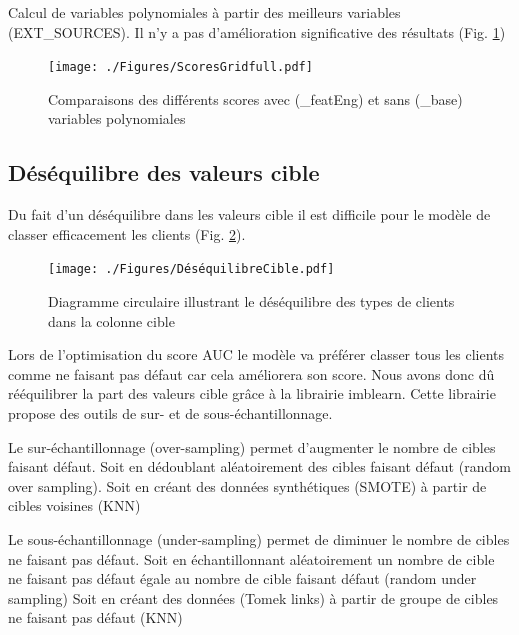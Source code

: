 \documentclass[12pt, a4paper]{article}
\begin{document}
Calcul de variables polynomiales à partir des meilleurs variables (EXT\_SOURCES).
Il n'y a pas d'amélioration significative des résultats (Fig. \ref{fig:ScoresGridFull})

\begin{figure}[h]
    \begin{center}
        \texttt{[image: ./Figures/ScoresGridfull.pdf]}
    \end{center}
    \caption{Comparaisons des différents scores avec (\_featEng) et sans (\_base) variables polynomiales}
    \label{fig:ScoresGridFull}
\end{figure}

\subsection{Déséquilibre des valeurs cible}

Du fait d'un déséquilibre dans les valeurs cible il est difficile pour le modèle de classer efficacement les clients (Fig. \ref{fig:DéséquilibreCible}).

\begin{figure}[h]
    \begin{center}
        \texttt{[image: ./Figures/DéséquilibreCible.pdf]}
    \end{center}
    \caption{Diagramme circulaire illustrant le déséquilibre des types de clients dans la colonne cible}
    \label{fig:DéséquilibreCible}
\end{figure}

Lors de l'optimisation du score AUC le modèle va préférer classer tous les clients comme ne faisant pas défaut car cela améliorera son score.
Nous avons donc dû rééquilibrer la part des valeurs cible grâce à la librairie imblearn.
Cette librairie propose des outils de sur- et de sous-échantillonnage.

Le sur-échantillonnage (over-sampling) permet d'augmenter le nombre de cibles faisant défaut.
Soit en dédoublant aléatoirement des cibles faisant défaut (random over sampling).
Soit en créant des données synthétiques (SMOTE) à partir de cibles voisines (KNN)

Le sous-échantillonnage (under-sampling) permet de diminuer le nombre de cibles ne faisant pas défaut.
Soit en échantillonnant aléatoirement un nombre de cible ne faisant pas défaut égale au nombre de cible faisant défaut (random under sampling)
Soit en créant des données (Tomek links) à partir de groupe de cibles ne faisant pas défaut (KNN)
\end{document}
